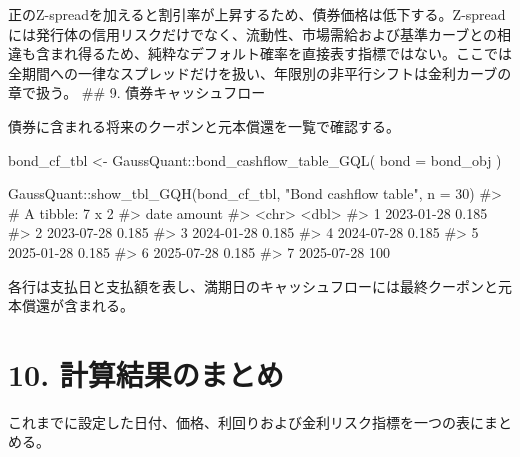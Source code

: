 \documentclass[
  letterpaper,
  DIV=11,
  numbers=noendperiod]{scrreprt}
\newenvironment{Shaded}{\begin{snugshade}}{\end{snugshade}}
\newcommand{\AttributeTok}[1]{\textcolor[rgb]{0.40,0.45,0.13}{#1}}
\newcommand{\CommentTok}[1]{\textcolor[rgb]{0.37,0.37,0.37}{#1}}
\newcommand{\DecValTok}[1]{\textcolor[rgb]{0.68,0.00,0.00}{#1}}
\newcommand{\FunctionTok}[1]{\textcolor[rgb]{0.28,0.35,0.67}{#1}}
\newcommand{\NormalTok}[1]{\textcolor[rgb]{0.00,0.23,0.31}{#1}}
\newcommand{\OtherTok}[1]{\textcolor[rgb]{0.00,0.23,0.31}{#1}}
\newcommand{\SpecialCharTok}[1]{\textcolor[rgb]{0.37,0.37,0.37}{#1}}
\newcommand{\StringTok}[1]{\textcolor[rgb]{0.13,0.47,0.30}{#1}}
\begin{document}
正のZ-spreadを加えると割引率が上昇するため、債券価格は低下する。Z-spreadには発行体の信用リスクだけでなく、流動性、市場需給および基準カーブとの相違も含まれ得るため、純粋なデフォルト確率を直接表す指標ではない。ここでは全期間への一律なスプレッドだけを扱い、年限別の非平行シフトは金利カーブの章で扱う。
\#\# 9. 債券キャッシュフロー

債券に含まれる将来のクーポンと元本償還を一覧で確認する。

\begin{Shaded}
\begin{Highlighting}[]
\NormalTok{bond\_cf\_tbl }\OtherTok{\textless{}{-}}\NormalTok{ GaussQuant}\SpecialCharTok{::}\FunctionTok{bond\_cashflow\_table\_GQL}\NormalTok{(}
  \AttributeTok{bond =}\NormalTok{ bond\_obj}
\NormalTok{)}

\NormalTok{GaussQuant}\SpecialCharTok{::}\FunctionTok{show\_tbl\_GQH}\NormalTok{(bond\_cf\_tbl, }\StringTok{"Bond cashflow table"}\NormalTok{, }\AttributeTok{n =} \DecValTok{30}\NormalTok{)}
\CommentTok{\#\textgreater{} \# A tibble: 7 x 2}
\CommentTok{\#\textgreater{}   date        amount}
\CommentTok{\#\textgreater{}   \textless{}chr\textgreater{}        \textless{}dbl\textgreater{}}
\CommentTok{\#\textgreater{} 1 2023{-}01{-}28   0.185}
\CommentTok{\#\textgreater{} 2 2023{-}07{-}28   0.185}
\CommentTok{\#\textgreater{} 3 2024{-}01{-}28   0.185}
\CommentTok{\#\textgreater{} 4 2024{-}07{-}28   0.185}
\CommentTok{\#\textgreater{} 5 2025{-}01{-}28   0.185}
\CommentTok{\#\textgreater{} 6 2025{-}07{-}28   0.185}
\CommentTok{\#\textgreater{} 7 2025{-}07{-}28 100}
\end{Highlighting}
\end{Shaded}

各行は支払日と支払額を表し、満期日のキャッシュフローには最終クーポンと元本償還が含まれる。

\section{10.
計算結果のまとめ}\label{ux8a08ux7b97ux7d50ux679cux306eux307eux3068ux3081}

これまでに設定した日付、価格、利回りおよび金利リスク指標を一つの表にまとめる。
\end{document}

